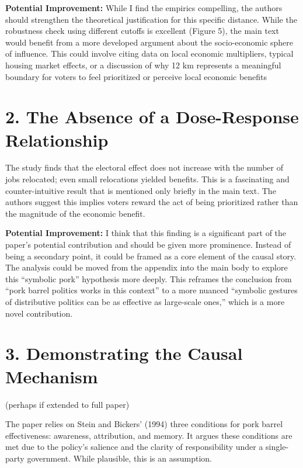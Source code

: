 \documentclass[
  letterpaper,
  DIV=11,
  numbers=noendperiod]{scrartcl}
\begin{document}
\textbf{Potential Improvement:} While I find the empirics compelling,
the authors should strengthen the theoretical justification for this
specific distance. While the robustness check using different cutoffs is
excellent (Figure 5), the main text would benefit from a more developed
argument about the socio-economic sphere of influence. This could
involve citing data on local economic multipliers, typical housing
market effects, or a discussion of why 12 km represents a meaningful
boundary for voters to feel prioritized or perceive local economic
benefits

\section{2. The Absence of a Dose-Response
Relationship}\label{the-absence-of-a-dose-response-relationship}

The study finds that the electoral effect does not increase with the
number of jobs relocated; even small relocations yielded benefits. This
is a fascinating and counter-intuitive result that is mentioned only
briefly in the main text. The authors suggest this implies voters reward
the act of being prioritized rather than the magnitude of the economic
benefit.

\textbf{Potential Improvement:} I think that this finding is a
significant part of the paper's potential contribution and should be
given more prominence. Instead of being a secondary point, it could be
framed as a core element of the causal story. The analysis could be
moved from the appendix into the main body to explore this ``symbolic
pork'' hypothesis more deeply. This reframes the conclusion from ``pork
barrel politics works in this context'' to a more nuanced ``symbolic
gestures of distributive politics can be as effective as large-scale
ones,'' which is a more novel contribution.

\section{3. Demonstrating the Causal
Mechanism}\label{demonstrating-the-causal-mechanism}

(perhaps if extended to full paper)

The paper relies on Stein and Bickers' (1994) three conditions for pork
barrel effectiveness: awareness, attribution, and memory. It argues
these conditions are met due to the policy's salience and the clarity of
responsibility under a single-party government. While plausible, this is
an assumption.
\end{document}
